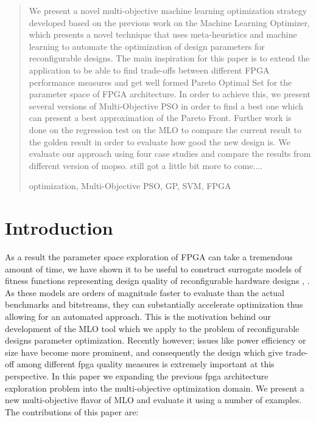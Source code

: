 \documentclass[12pt, runningheads,a4paper]{llncs}
\newcommand{\keywords}[1]{\par\addvspace\baselineskip
\noindent\keywordname\enspace\ignorespaces#1}
\begin{document}

\maketitle
\begin{abstract}


 We present a novel multi-objective machine learning optimization strategy developed based on the previous work on the Machine Learning Optimizer, which presents a novel technique that uses meta-heuristics and machine learning to automate the optimization of design parameters for reconfigurable designs. The main inspiration for this paper is to extend the application to be able to find trade-offs between different FPGA performance measures and get well formed Pareto Optimal Set for the parameter space of FPGA architecture. In order to achieve this, we present several versions of Multi-Objective PSO in order to find a best one which can present a best approximation of the Pareto Front. Further work is done on the regression test on the MLO to compare the current result to the golden result in order to evaluate how good the new design is. We evaluate our approach using four case studies and compare the results from different version of \ac{mopso}. still got a little bit more to come....


\keywords{optimization, Multi-Objective PSO, GP, SVM, FPGA}

\end{abstract}

\section{Introduction}

 As a result the parameter space exploration of FPGA can take a tremendous amount of time, we have shown it to be useful to construct surrogate models of fitness functions representing design quality of reconfigurable hardware designs \cite{arc2012MLO}, \cite{fpt2012MLO}. As these models are orders of magnitude faster to evaluate than the actual benchmarks and bitstreams, they can substantially accelerate optimization thus allowing for an automated approach. This is the motivation behind our development of the MLO tool which we apply to the problem of reconfigurable designs parameter optimization. Recently however; issues like power efficiency or size have become more prominent, and consequently the design which give trade-off among different \ac{fpga} quality measures is extremely important at this perspective. In this paper we expanding the previous \ac{fpga} architecture exploration problem into the multi-objective optimization domain. We present a new multi-objective flavor of MLO and evaluate it using a number of examples. The contributions of this paper are:
\end{document}
